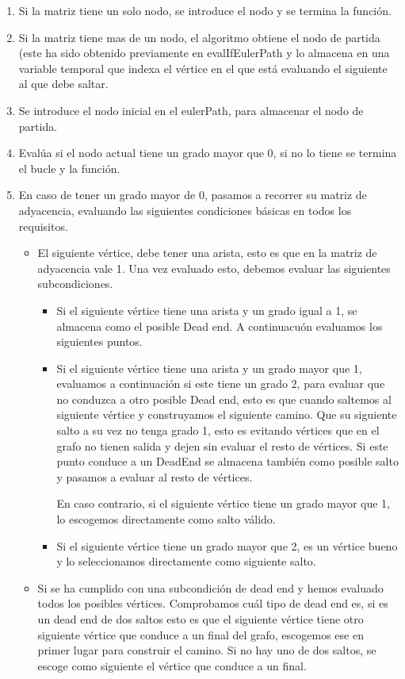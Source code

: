 \begin{enumerate}
    \item Si la matriz tiene un solo nodo, se introduce el nodo y se termina la función.
    \item Si la matriz tiene mas de un nodo, el algoritmo obtiene el nodo de partida (este ha sido obtenido previamente en evalIfEulerPath y lo almacena en una variable temporal que indexa el vértice en el que está evaluando el siguiente al que debe saltar.
    \item Se introduce el nodo inicial en el eulerPath, para almacenar el nodo de partida.
    \item Evalúa si el nodo actual tiene un grado mayor que 0, si no lo tiene se termina el bucle y la función. 
    \item En caso de tener un grado mayor de 0, pasamos a recorrer su matriz de adyacencia, evaluando las siguientes condiciones básicas en todos los requisitos.
    \begin{itemize}
        \item El siguiente vértice, debe tener una arista, esto es que en la matriz de adyacencia vale 1. Una vez evaluado esto, debemos evaluar las siguientes subcondiciones.
        \begin{itemize}
            \item Si el siguiente vértice tiene una arista y un grado igual a 1, se almacena como el posible Dead end. A continuacuón evaluamos los siguientes puntos.
            \item Si el siguiente vértice tiene una arista y un grado mayor que 1, evaluamos a continuación si este tiene un grado 2, para evaluar que no conduzca a otro posible Dead end, esto es que cuando saltemos al siguiente vértice y construyamos el siguiente camino. Que su siguiente salto a su vez no tenga grado 1, esto es evitando vértices que en el grafo no tienen salida y dejen sin evaluar el resto de vértices. Si este punto conduce a un DeadEnd se almacena también como posible salto y pasamos a evaluar al resto de vértices. 
            
            En caso contrario, si el siguiente vértice tiene un grado mayor que 1, lo escogemos directamente como salto válido.
            \item Si el siguiente vértice tiene un grado mayor que 2, es un vértice bueno y lo seleccionamos directamente como siguiente salto.
        \end{itemize}

        \item Si se ha cumplido con una subcondición de dead end y hemos evaluado todos los posibles vértices. Comprobamos cuál tipo de dead end es, si es un dead end de dos saltos esto es que el siguiente vértice tiene otro siguiente vértice que conduce a un final del grafo, escogemos ese en primer lugar para construir el camino. Si no hay uno de dos saltos, se escoge como siguiente el vértice que conduce a un final.
    \end{itemize}
\end{enumerate}

